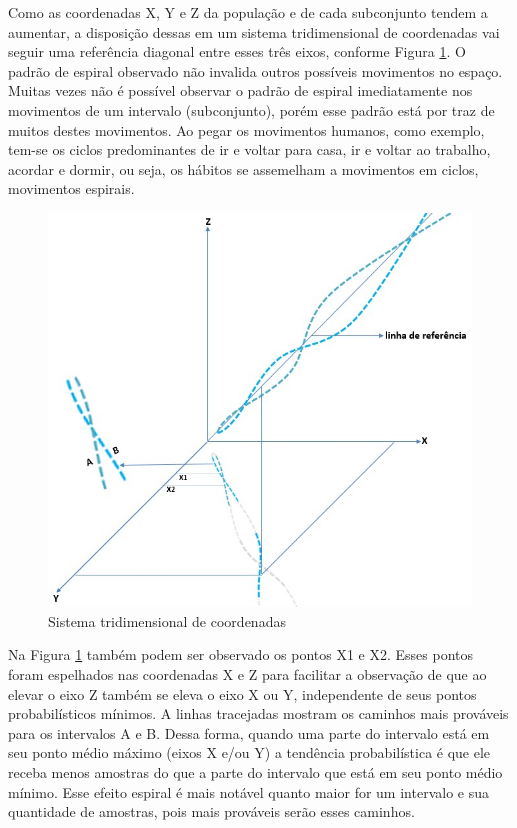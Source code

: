 Como as coordenadas X, Y e Z da população e de cada subconjunto tendem a aumentar, a disposição dessas em um sistema tridimensional de coordenadas vai seguir uma referência diagonal entre esses três eixos, conforme Figura \ref{fig:consciousness_space_spiral_reference_line}. O padrão de espiral observado não invalida outros possíveis movimentos no espaço. Muitas vezes não é possível observar o padrão de espiral imediatamente nos movimentos de um intervalo (subconjunto), porém esse padrão está por traz de muitos destes movimentos. Ao pegar os movimentos humanos, como exemplo, tem-se os ciclos predominantes de ir e voltar para casa, ir e voltar ao trabalho, acordar e dormir, ou seja, os hábitos se assemelham a movimentos em ciclos, movimentos espirais.
	\begin{figure}[H]
	\caption{Sistema tridimensional de coordenadas}
	\label{fig:consciousness_space_spiral_reference_line}
	\centering
	\includegraphics[scale=.6]{sections/images/consciousness_space_spiral_reference_line.jpg}
	\end{figure}

Na Figura \ref{fig:consciousness_space_spiral_reference_line} também podem ser observado os pontos X1 e X2. Esses pontos foram espelhados nas coordenadas X e Z para facilitar a observação de que ao elevar o eixo Z também se eleva o eixo X ou Y, independente de seus pontos probabilísticos mínimos. A linhas tracejadas mostram os caminhos mais prováveis para os intervalos A e B. Dessa forma, quando uma parte do intervalo está em seu ponto médio máximo (eixos X e/ou Y) a tendência probabilística é que ele receba menos amostras do que a parte do intervalo que está em seu ponto médio mínimo. Esse efeito espiral é mais notável quanto maior for um intervalo e sua quantidade de amostras, pois mais prováveis serão esses caminhos.

